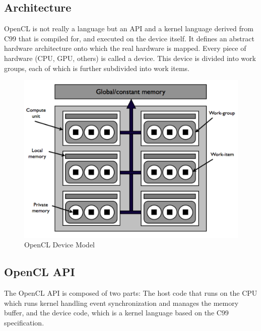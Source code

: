 \subsection{Architecture}

\gls{OpenCL} is not really a language but an \gls{API} and a kernel language derived from C99 that is compiled for, and executed on the device itself. It defines an abstract hardware architecture onto which the real hardware is mapped. Every piece of hardware (\gls{CPU}, \gls{GPU}, others) is called a device. This device is divided into work groups, each of which is further subdivided into work items.

\begin{figure}[H]
\caption{OpenCL Device Model\cite{OpenCLInAction}}
\centering
\includegraphics[scale=0.5]{OpenCL_Device_Model.pdf}
\end{figure}

\subsection{OpenCL API}

The \gls{OpenCL} \gls{API} is composed of two parts: The host code that runs on the CPU which runs kernel handling event synchronization and manages the memory buffer, and the device code, which is a kernel language based on the C99 specification.

